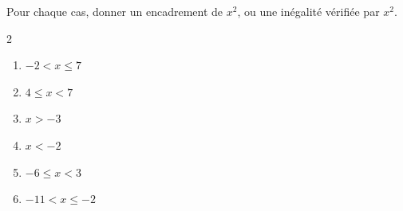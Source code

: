\begin{exo}{}
	Pour chaque cas, donner un encadrement de $x^2$, ou une inégalité vérifiée par $x^2$.
	\vspace*{-2mm}
	\begin{multicols}{2}
		\begin{enumerate}[itemsep=2mm]
			\item $-2 < x \le 7$
			\item $4 \le x < 7$
			\item $x > -3$
			\item $x < -2$
			\item $-6 \le x < 3$
			\item $-11 < x \le -2$
		\end{enumerate}
	\end{multicols}\vspace*{-2mm}
\end{exo}
